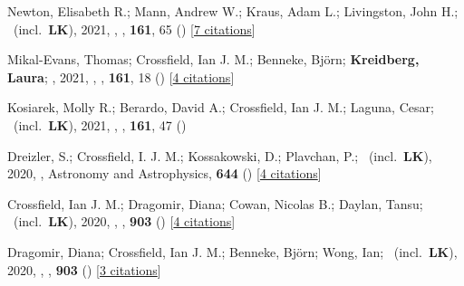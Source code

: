 \item[{\color{numcolor}\scriptsize49}] Newton, Elisabeth R.; Mann, Andrew W.; Kraus, Adam L.; Livingston, John H.; \etal\ (incl.\ \textbf{LK}), 2021, , \aj, \textbf{161}, 65 () [\href{https://ui.adsabs.harvard.edu/abs/2021AJ....161...65N}{7 citations}]

\item[{\color{numcolor}\scriptsize48}] Mikal-Evans, Thomas; Crossfield, Ian J. M.; Benneke, Bj{\"o}rn; \textbf{Kreidberg, Laura}; \etal, 2021, , \aj, \textbf{161}, 18 () [\href{https://ui.adsabs.harvard.edu/abs/2021AJ....161...18M}{4 citations}]

\item[{\color{numcolor}\scriptsize47}] Kosiarek, Molly R.; Berardo, David A.; Crossfield, Ian J. M.; Laguna, Cesar; \etal\ (incl.\ \textbf{LK}), 2021, , \aj, \textbf{161}, 47 ()

\item[{\color{numcolor}\scriptsize46}] Dreizler, S.; Crossfield, I. J. M.; Kossakowski, D.; Plavchan, P.; \etal\ (incl.\ \textbf{LK}), 2020, , Astronomy and Astrophysics, \textbf{644} () [\href{https://ui.adsabs.harvard.edu/abs/2020A&A...644A.127D}{4 citations}]

\item[{\color{numcolor}\scriptsize45}] Crossfield, Ian J. M.; Dragomir, Diana; Cowan, Nicolas B.; Daylan, Tansu; \etal\ (incl.\ \textbf{LK}), 2020, , \apj, \textbf{903} () [\href{https://ui.adsabs.harvard.edu/abs/2020ApJ...903L...7C}{4 citations}]

\item[{\color{numcolor}\scriptsize44}] Dragomir, Diana; Crossfield, Ian J. M.; Benneke, Bj{\"o}rn; Wong, Ian; \etal\ (incl.\ \textbf{LK}), 2020, , \apj, \textbf{903} () [\href{https://ui.adsabs.harvard.edu/abs/2020ApJ...903L...6D}{3 citations}]

